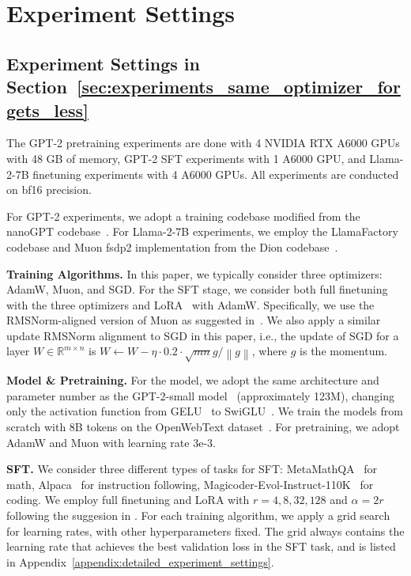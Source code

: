 \documentclass{article}
\theoremstyle{remark}
\newcommand{\Norm}[1]{\left\|#1\right\|}
\newcommand{\RR}{\mathbb{R}}
\begin{document}




\appendix



\section{Experiment Settings}\label{appendix:experiment_setting}


\subsection{Experiment Settings in Section~\ref{sec:experiments_same_optimizer_forgets_less}}\label{appendix:experiment_settings_same_optimizer_forgets_less}
The GPT-2 pretraining experiments are done with 4 NVIDIA RTX A6000 GPUs with 48 GB of memory, GPT-2 SFT experiments with 1 A6000 GPU, and Llama-2-7B finetuning experiments with 4 A6000 GPUs. All experiments are conducted on bf16 precision.

For GPT-2 experiments, we adopt a training codebase modified from the nanoGPT codebase~\citep{karpathy2022nanogpt}.
For Llama-2-7B experiments, we employ the LlamaFactory~\citep{zheng2024llamafactory} codebase and Muon fsdp2 implementation from the Dion codebase~\citep{ahn2025dion,ahn2025dion2}.


\textbf{Training Algorithms.} In this paper, we typically consider three optimizers: AdamW, Muon, and SGD. For the SFT stage, we consider both full finetuning with the three optimizers and LoRA~\citep{hu2022lora} with AdamW. Specifically, we use the RMSNorm-aligned version of Muon as suggested in~\citep{liu2025muon}. We also apply a similar update RMSNorm alignment to SGD in this paper, i.e., the update of SGD for a layer $W \in \RR^{m\times n}$ is $W \gets W - \eta \cdot 0.2 \cdot \sqrt{mn} g / \Norm{g}$, where $g$ is the momentum.

\textbf{Model \& Pretraining.}
For the model, we adopt the same architecture and parameter number as the GPT-2-small model~\citep{ouyang2022instructgpt} (approximately 123M), changing only the activation function from GELU~\citep{hendrycks2016gaussian} to SwiGLU~\citep{shazeer2020glu}. We train the models from scratch with 8B tokens on the OpenWebText dataset~\citep{gokaslan2019openWeb}. For pretraining, we adopt AdamW and Muon with learning rate 3e-3. 

\textbf{SFT.} We consider three different types of tasks for SFT: MetaMathQA~\citep{yu2023metamath} for math, Alpaca~\citep{alpaca} for instruction following, Magicoder-Evol-Instruct-110K~\citep{wei2023magicoder} for coding. 
We employ full finetuning and LoRA with $r=4,8,32,128$ and $\alpha=2r$ following the suggesion in \citet{biderman2024lora}. 
For each training algorithm, we apply a grid search for learning rates, with other hyperparameters fixed. The grid always contains the learning rate that achieves the best validation loss in the SFT task, and is listed in Appendix~\ref{appendix:detailed_experiment_settings}. 
\end{document}
